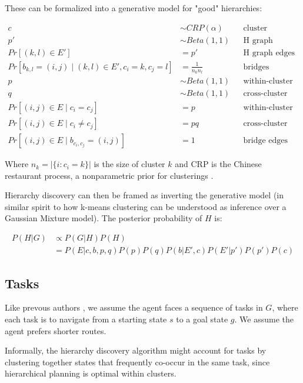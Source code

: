 \documentclass[11pt]{article}
\begin{document}
These can be formalized into a generative model for "good" hierarchies:

\begin{align*}
    c &\sim CRP(\alpha)  		&& \text{cluster assignments} \\
    p' &\sim Beta(1,1)   		&& \text{H graph density} \\
    Pr[(k,l) \in E'] &= p'      && \text{H graph edges} \\
    Pr[b_{k,l} = (i,j) \mid (k,l) \in E', c_i = k, c_j = l] &= \frac{1}{n_k n_l}   && \text{bridges}  \\
    p &\sim Beta(1,1)  		&& \text{within-cluster density} \\
    q &\sim Beta(1,1)  		&& \text{cross-cluster density penalty} \\
    Pr[(i,j) \in E \mid c_i = c_j] &= p    && \text{within-cluster edges} \\
    Pr[(i,j) \in E \mid c_i \ne c_j] &= pq    && \text{cross-cluster edges} \\
    Pr[(i,j) \in E \mid b_{c_i,c_j} = (i,j)] &= 1    && \text{bridge edges} 
\end{align*}

Where $n_k = |\{ i : c_i=k \}|$ is the size of cluster $k$ and CRP is the Chinese restaurant process, a nonparametric prior for clusterings \cite{gershman2012tutorial}. 

Hierarchy discovery can then be framed as inverting the generative model (in similar spirit to how k-means clustering can be understood as inference over a Gaussian Mixture model). The posterior probability of $H$ is:

\begin{align}
\label{eq:post}
    P(H|G) &\propto P(G|H) P(H) \\
    &= P(E|c,b,p,q) P(p) P(q) P(b|E',c) P(E'|p') P(p') P(c)
\end{align}


\subsection{Tasks}

Like prevous authors \cite{Solway2014, balaguer2016neural}, we assume the agent faces a sequence of tasks in $G$, where each task is to navigate from a starting state $s$ to a goal state $g$. We assume the agent prefers shorter routes.

Informally, the hierarchy discovery algorithm might account for tasks by clustering together states that frequently co-occur in the same task, since hierarchical planning is optimal within clusters. 
\end{document}
